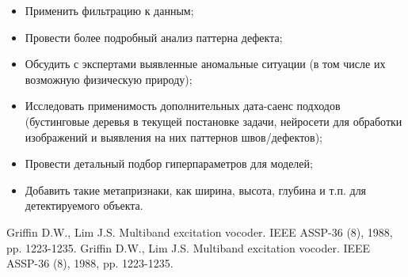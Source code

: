 \documentclass[a4paper,article,14pt]{extarticle}
\begin{document}
\begin{itemize}
    \item Применить фильтрацию к данным;
    \item Провести более подробный анализ паттерна дефекта;
    \item Обсудить с экспертами выявленные аномальные ситуации (в том числе их возможную физическую природу);
    \item Исследовать применимость дополнительных дата-саенс подходов (бустинговые деревья в текущей постановке задачи, нейросети для обработки изображений и выявления на них паттернов швов/дефектов);
    \item Провести детальный подбор гиперпараметров для моделей;
    \item Добавить такие метапризнаки, как ширина, высота, глубина и т.п. для детектируемого объекта.
\end{itemize}

\begin{thebibliography}{1}
 Griffin D.W., Lim J.S. \flqq Multiband excitation vocoder\frqq. IEEE ASSP-36 (8), 1988, pp. 1223-1235.
 Griffin D.W., Lim J.S. \flqq Multiband excitation vocoder\frqq. IEEE ASSP-36 (8), 1988, pp. 1223-1235.
\end{thebibliography}
\end{document}
